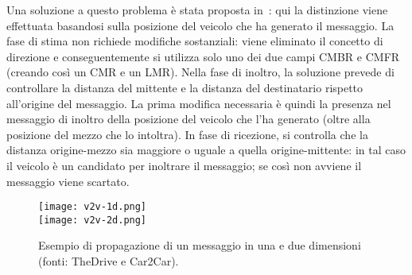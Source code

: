 Una soluzione a questo problema è stata proposta in~\cite{Barichello2017propagazione}:
qui la distinzione viene effettuata basandosi sulla posizione del veicolo che ha generato il messaggio.
La fase di stima non richiede modifiche sostanziali: viene eliminato il concetto di direzione e conseguentemente si utilizza solo uno dei due campi CMBR e CMFR
(creando così un CMR e un LMR).
Nella fase di inoltro, la soluzione prevede di controllare la distanza del mittente e la distanza del destinatario rispetto all'origine del messaggio.
La prima modifica necessaria è quindi la presenza nel messaggio di inoltro della posizione del veicolo che l'ha generato (oltre alla posizione del mezzo che lo intoltra).
In fase di ricezione, si controlla che la distanza origine-mezzo sia maggiore o uguale a quella origine-mittente: in tal caso il veicolo è un candidato per inoltrare il messaggio;
se così non avviene il messaggio viene scartato.
%
\begin{figure}[htbp]
	\centering
		\texttt{[image: v2v-1d.png]} \\
		\vspace{7pt}
		\texttt{[image: v2v-2d.png]}
\caption{Esempio di propagazione di un messaggio in una e due dimensioni (fonti: TheDrive e Car2Car).\label{fig:v2v-1d-2d}}
\end{figure}
%

